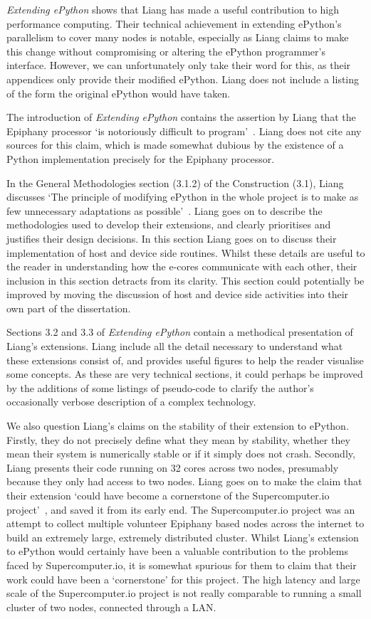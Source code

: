 \documentclass{report}[a4]
\begin{document}
 \textit{Extending ePython} shows that Liang has made a useful contribution to high performance computing. Their technical achievement in extending ePython's parallelism to cover many nodes is notable, especially as Liang claims to make this change without compromising or altering the ePython programmer's interface. However, we can unfortunately only take their word for this, as their appendices only provide their  modified ePython. Liang does not include a listing of the form the original ePython would have taken.

 The introduction of \textit{Extending ePython} contains the assertion by Liang that the Epiphany processor `is  notoriously  difficult  to  program'~\cite{Liang2017}. Liang does not cite any sources for this claim, which is made somewhat dubious by the existence of a Python implementation precisely for the Epiphany processor.

 In the General Methodologies section (3.1.2) of the Construction (3.1), Liang discusses  `The principle of modifying ePython in the whole project is to make as few unnecessary adaptations as possible'~\cite{Liang2017}. Liang goes on to describe the methodologies used to develop their extensions, and clearly prioritises and justifies their design decisions. In this section Liang goes on to  discuss their implementation of host and device side routines. Whilst these details are useful to the reader in understanding how the e-cores communicate with each other, their inclusion in this section detracts from its clarity. This section could potentially be improved by moving the discussion of host and device side activities into their own part of the dissertation.

 Sections 3.2 and 3.3 of \textit{Extending ePython} contain a methodical presentation of Liang's extensions. Liang include all the detail necessary to understand what these extensions consist of, and provides useful figures to help the reader visualise some concepts. As these are very technical sections, it could perhaps be improved by the additions of some listings of pseudo-code to clarify the author's occasionally verbose description of a complex technology.

 We also question Liang's claims on the stability of their extension to ePython. Firstly, they do not precisely define what they mean by stability, whether they mean their system is numerically stable or if it simply does not crash. Secondly, Liang presents their code running on 32 cores across two nodes, presumably because they only had access to two nodes. Liang goes on to make the claim that their extension `could have become a cornerstone of the Supercomputer.io project'~\cite{Liang2017}, and saved it from its early end. The Supercomputer.io project was an attempt to collect multiple volunteer Epiphany based nodes across the internet to build an extremely large, extremely distributed cluster. Whilst Liang's extension to ePython would certainly have been a valuable contribution to the problems faced by Supercomputer.io, it is somewhat spurious for them to claim that their work could have been a `cornerstone' for this project. The high latency and large scale of the Supercomputer.io project is not really comparable to running a small cluster of two nodes, connected through a LAN.
\end{document}
